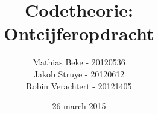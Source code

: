 \documentclass[a4paper,11pt]{article}
\author{Mathias Beke - 20120536\\ Jakob Struye - 20120612 \\ Robin Verachtert - 20121405}
\title{Codetheorie: \\Ontcijferopdracht}
\date{26 march 2015}
\begin{document}
\maketitle 
\tableofcontents
\pagebreak







\end{document}
